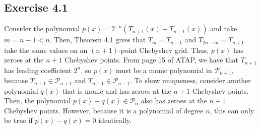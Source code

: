 \documentclass{article}
\begin{document}
\subsection{Exercise 4.1}
Consider the polynomial $p(x)=2^{-n}(T_{n+1}(x)-T_{n-1}(x))$ and take $m=n-1<n$. Then, Theorem 4.1 gives that $T_m=T_{n-1}$ and $T_{2n-m}=T_{n+1}$ take the same values on an $(n+1)$-point Chebyshev grid. Thus, $p(x)$ has zeroes at the $n+1$ Chebyshev points. From page 15 of ATAP, we have that $T_{n+1}$ has leading coefficient $2^n$, so $p(x)$ must be a monic polynomial in $\mathcal{P}_{n+1}$, because $T_{n+1}\in\mathcal{P}_{n+1}$ and $T_{n-1}\in\mathcal{P}_{n-1}$. To show uniqueness, consider another polynomial $q(x)$ that is monic and has zeroes at the $n+1$ Chebyshev points. Then, the polynomial $p(x)-q(x)\in\mathcal{P}_n$ also has zeroes at the $n+1$ Chebyshev points. However, because it is a polynomial of degree $n$, this can only be true if $p(x)-q(x)=0$ identically.
\end{document}
